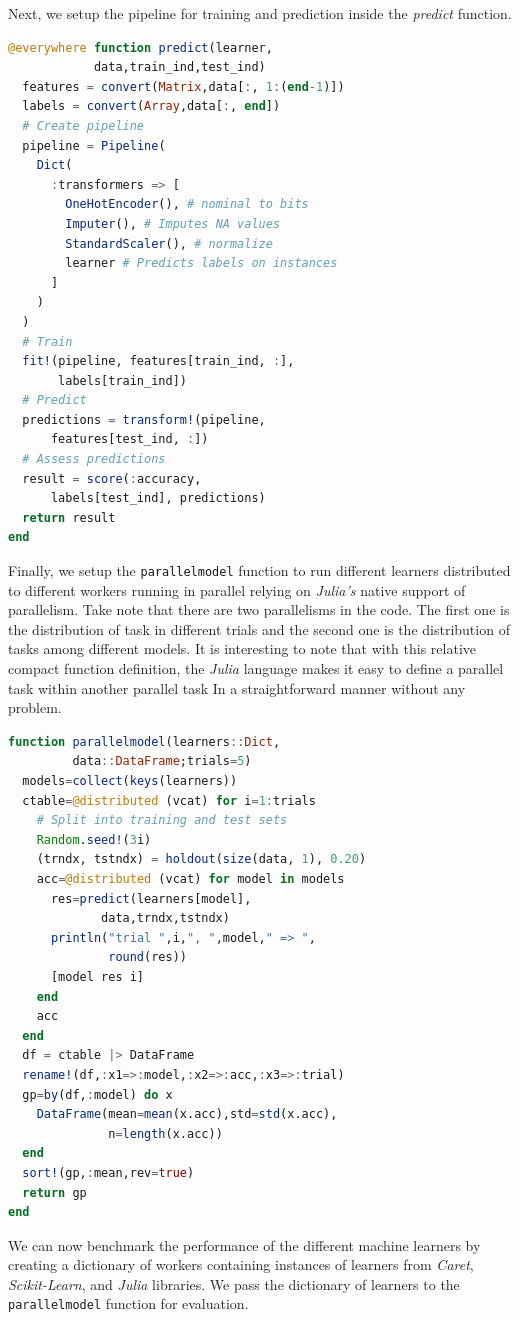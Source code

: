 \documentclass{juliacon}
\begin{document}
Next, we setup the pipeline for training and prediction inside the \emph{predict} function.

\begin{lstlisting}[language = Julia]
@everywhere function predict(learner,
            data,train_ind,test_ind)        
  features = convert(Matrix,data[:, 1:(end-1)])
  labels = convert(Array,data[:, end])
  # Create pipeline
  pipeline = Pipeline(
    Dict(
      :transformers => [
        OneHotEncoder(), # nominal to bits
        Imputer(), # Imputes NA values
        StandardScaler(), # normalize
        learner # Predicts labels on instances
      ]
    )
  )
  # Train
  fit!(pipeline, features[train_ind, :],
       labels[train_ind])  
  # Predict
  predictions = transform!(pipeline, 
      features[test_ind, :])
  # Assess predictions
  result = score(:accuracy, 
      labels[test_ind], predictions)
  return result
end
\end{lstlisting}

Finally, we setup the \texttt{parallelmodel} function to run different learners distributed to different workers running in parallel relying on \emph{Julia's} native support of parallelism. Take note that there are two parallelisms in the code. The first one is the distribution of task in different trials and the second one is the distribution of tasks among different models. It is interesting to note that with this relative compact function definition, the \emph{Julia} language makes it easy to define a parallel task within another parallel task 
In a straightforward manner without any problem.

\begin{lstlisting}[language = Julia]
function parallelmodel(learners::Dict,
         data::DataFrame;trials=5)
  models=collect(keys(learners))
  ctable=@distributed (vcat) for i=1:trials
    # Split into training and test sets
    Random.seed!(3i)
    (trndx, tstndx) = holdout(size(data, 1), 0.20)
    acc=@distributed (vcat) for model in models
      res=predict(learners[model],
             data,trndx,tstndx)
      println("trial ",i,", ",model," => ",
              round(res))
      [model res i]
    end
    acc
  end
  df = ctable |> DataFrame
  rename!(df,:x1=>:model,:x2=>:acc,:x3=>:trial)
  gp=by(df,:model) do x
    DataFrame(mean=mean(x.acc),std=std(x.acc),
              n=length(x.acc)) 
  end
  sort!(gp,:mean,rev=true)
  return gp
end
\end{lstlisting}

We can now benchmark the performance of the different machine learners by creating a dictionary of workers containing instances of learners from \emph{Caret}, \emph{Scikit-Learn}, and \emph{Julia} libraries. We pass the dictionary of learners to the \texttt{parallelmodel} function for evaluation.
\end{document}
